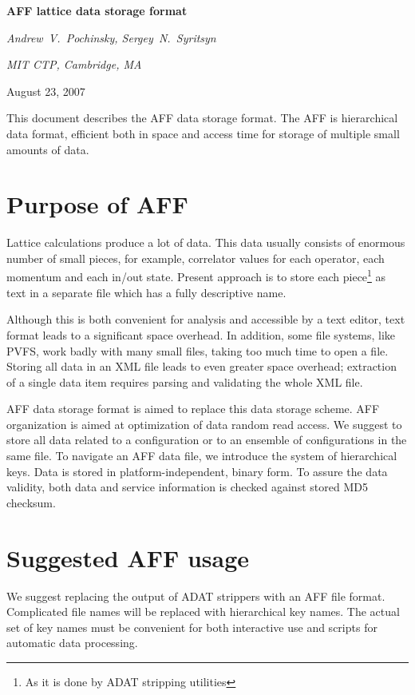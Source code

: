 \documentclass[10pt,letterpaper]{article}
\begin{document}
\centerline{\huge\bf AFF lattice data storage format}
\vspace{20pt}
\centerline{\it Andrew~V.~Pochinsky, Sergey~N.~Syritsyn}
\centerline{\it MIT CTP, Cambridge, MA}
\vspace{10pt}
\centerline{August 23, 2007}
\vspace{20pt}

\noindent This document describes the AFF data storage format. 
The AFF is hierarchical data format, efficient both in space and access time 
for storage of multiple small amounts of data.

\newpage
\tableofcontents
\newpage

\section{Purpose of AFF}
Lattice calculations produce a lot of data. 
This data usually consists of enormous number of small pieces, for example, correlator values for
each operator, each momentum and each in/out state.
Present approach is to store each piece\footnote{As it is done by ADAT stripping utilities}
as text in a separate file which has a fully descriptive name. 

Although this is both convenient for analysis and accessible by a text editor, text format leads
to a significant space overhead. 
In addition, some file systems, like PVFS, work badly with
many small files, taking too much time to open a file. 
Storing all data in an XML file leads to even greater space overhead; extraction of a single
data item requires parsing and validating the whole XML file.

AFF data storage format is aimed to replace this data storage scheme. 
AFF organization is aimed at optimization of data random read access.
We suggest to store all data related to a configuration or to an ensemble of configurations in
the same file.
To navigate an AFF data file, we introduce the system of hierarchical keys.
Data is stored in platform-independent, binary form.
To assure the data validity, both data and service information is checked against stored
MD5 checksum.



\section{Suggested AFF usage}

We suggest replacing the output of ADAT strippers with an AFF file format. 
Complicated file names will be replaced with hierarchical key names. 
The actual set of key names must be convenient for both interactive use and 
scripts for automatic data processing.
\end{document}
